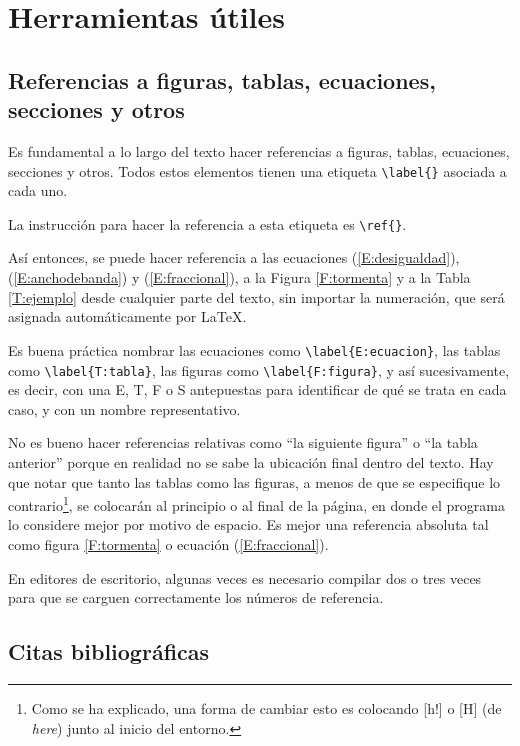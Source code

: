\documentclass[12pt,letterpaper]{article}
\begin{document}
\section{Herramientas útiles}

\subsection{Referencias a figuras, tablas, ecuaciones, secciones y otros}

Es fundamental a lo largo del texto hacer referencias a figuras, tablas, ecuaciones, secciones y otros. Todos estos elementos tienen una etiqueta \verb+\label{}+ asociada a cada uno. 

La instrucción para hacer la referencia a esta etiqueta es \verb+\ref{}+.

Así entonces, se puede hacer referencia a las ecuaciones (\ref{E:desigualdad}), (\ref{E:anchodebanda}) y (\ref{E:fraccional}), a la Figura \ref{F:tormenta} y a la Tabla \ref{T:ejemplo} desde cualquier parte del texto, sin importar la numeración, que será asignada automáticamente por \LaTeX.

Es buena práctica nombrar las ecuaciones como \verb+\label{E:ecuacion}+, las tablas como \verb+\label{T:tabla}+, las figuras como \verb+\label{F:figura}+, y así sucesivamente, es decir, con una E, T, F o S antepuestas para identificar de qué se trata en cada caso, y con un nombre representativo. 

No es bueno hacer referencias relativas como ``la siguiente figura'' o ``la tabla anterior'' porque en realidad no se sabe la ubicación final dentro del texto. Hay que notar que tanto las tablas como las figuras, a menos de que se especifique lo contrario\footnote{Como se ha explicado, una forma de cambiar esto es colocando [h!] o [H] (de \emph{here}) junto al inicio del entorno.}, se colocarán al principio o al final de la página, en donde el programa lo considere mejor por motivo de espacio. Es mejor una referencia absoluta tal como figura \ref{F:tormenta} o ecuación (\ref{E:fraccional}). 

En editores de escritorio, algunas veces es necesario compilar dos o tres veces para que se carguen correctamente los números de referencia.

\subsection{Citas bibliográficas}
\end{document}
